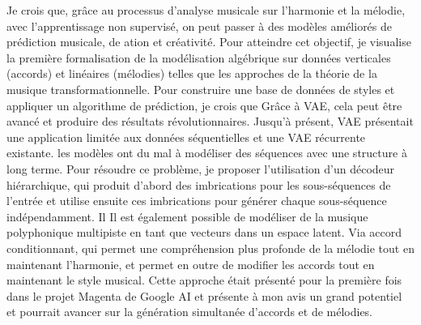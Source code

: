 Je crois que, grâce au processus d'analyse musicale sur l'harmonie et la mélodie,
avec l’apprentissage non supervisé, on peut passer à des modèles améliorés de prédiction musicale, de
ation et créativité. Pour atteindre cet objectif, je visualise la première formalisation de la modélisation algébrique sur
données verticales (accords) et linéaires (mélodies) telles que les approches de la théorie de la musique transformationnelle.
Pour construire une base de données de styles et appliquer un algorithme de prédiction, je crois que
Grâce à VAE, cela peut être avancé et produire des résultats révolutionnaires.
Jusqu’à présent, VAE présentait une application limitée aux données séquentielles et une VAE récurrente existante.
les modèles ont du mal à modéliser des séquences avec une structure à long terme. Pour résoudre ce problème, je
proposer l'utilisation d'un décodeur hiérarchique, qui produit d'abord des imbrications pour les sous-séquences
de l’entrée et utilise ensuite ces imbrications pour générer chaque sous-séquence indépendamment. Il
Il est également possible de modéliser de la musique polyphonique multipiste en tant que vecteurs dans un espace latent. Via accord
conditionnant, qui permet une compréhension plus profonde de la mélodie tout en maintenant l’harmonie,
et permet en outre de modifier les accords tout en maintenant le style musical. Cette approche était
présenté pour la première fois dans le projet Magenta de Google AI et présente à mon avis un grand potentiel
et pourrait avancer sur la génération simultanée d'accords et de mélodies.
